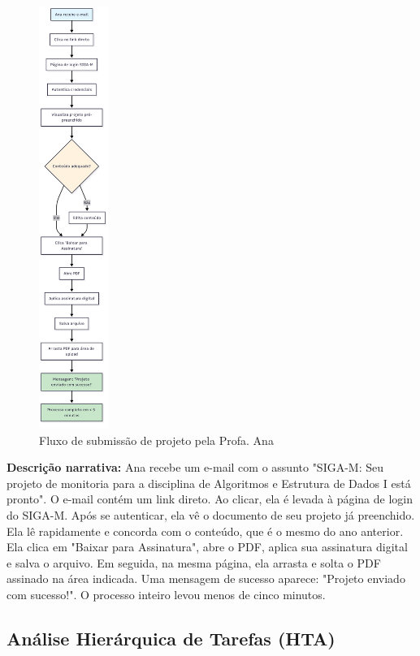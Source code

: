 \documentclass[12pt, a4paper]{report}
\begin{document}
\begin{figure}[H]
\centering
\includegraphics[width=0.2\textwidth]{ana.png}
\caption{Fluxo de submissão de projeto pela Profa. Ana}
\label{fig:cenario-ana}
\end{figure}

\textbf{Descrição narrativa:}
Ana recebe um e-mail com o assunto "SIGA-M: Seu projeto de monitoria para a disciplina de Algoritmos e Estrutura de Dados I está pronto". O e-mail contém um link direto. Ao clicar, ela é levada à página de login do SIGA-M. Após se autenticar, ela vê o documento de seu projeto já preenchido. Ela lê rapidamente e concorda com o conteúdo, que é o mesmo do ano anterior. Ela clica em "Baixar para Assinatura", abre o PDF, aplica sua assinatura digital e salva o arquivo. Em seguida, na mesma página, ela arrasta e solta o PDF assinado na área indicada. Uma mensagem de sucesso aparece: "Projeto enviado com sucesso!". O processo inteiro levou menos de cinco minutos.

\subsection{Análise Hierárquica de Tarefas (HTA)}
\end{document}
